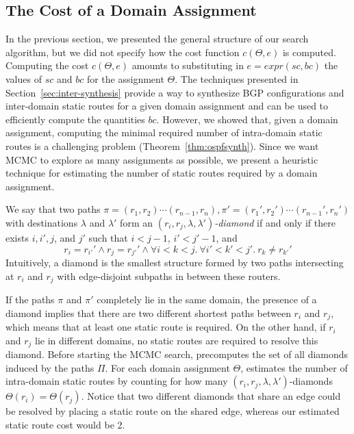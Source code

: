 \subsection{The Cost of a Domain Assignment}
\label{sec:cost-fun}
In the previous section, we presented the general structure of our search algorithm,
but we did not specify how the cost function $c(\Theta,e)$
is computed. 
Computing the cost $c(\Theta,e)$ amounts to substituting in 
$e=expr(sc, bc)$
the values of 
$sc$ and $bc$ for the assignment $\Theta$.
The techniques presented in Section~\ref{sec:inter-synthesis} 
provide a way to 
synthesize BGP configurations and 
inter-domain static routes for a 
given domain assignment
and can be used to 
efficiently compute the quantities $bc$.
However, we showed that, given a domain assignment, 
computing the  minimal required number of intra-domain 
static routes 
is a challenging problem (Theorem~\ref{thm:ospfsynth}).
Since we want MCMC to explore as many assignments as possible,
we present a heuristic technique for estimating
 the number of static routes required by a domain assignment. 


We say that two paths $\pi=(r_1,r_2)\cdots (r_{n-1},r_n), \pi'=(r_1',r_2')\cdots (r_{n-1}',r_n')$ with destinations $\lambda$ and $\lambda'$
form an $(r_i, r_j, \lambda, \lambda')$\emph{-diamond} if and only if
there exists $i,i',j$, and $j'$ such that $i<j-1$, $i'<j'-1$, and
\[
r_i{=}r_{i'}' \wedge  r_j{=}r_{j'}' \wedge  \forall i{<}k{<}j.~\forall i'{<}k'{<}j'.~r_{k}{\neq} r_{k'}'  
\]
Intuitively, a diamond is the smallest structure formed by two
paths intersecting at $r_i$ and $r_j$ with edge-disjoint subpaths in 
between these routers. 

If the paths $\pi$ and $\pi'$ completely lie in the same domain,
the presence of a diamond 
implies that there are two different 
shortest paths between $r_i$ and $r_j$, 
which means that
at least one static route is required.
On the other hand, if $r_i$ and $r_j$ lie in
different domains, no static routes 
are required to resolve this diamond. 
Before  starting the MCMC search, \name precomputes
the set of all diamonds induced by the paths $\Pi$. 
For each
domain assignment $\Theta$,
\name estimates the number of intra-domain
static routes by counting for 
how many $(r_i, r_j, \lambda, \lambda')$-diamonds
$\Theta(r_i) = \Theta(r_j)$. 
Notice that two different diamonds that share 
an edge could be resolved
by placing a static route on the shared edge, 
whereas our estimated static route cost 
would be 2. 

